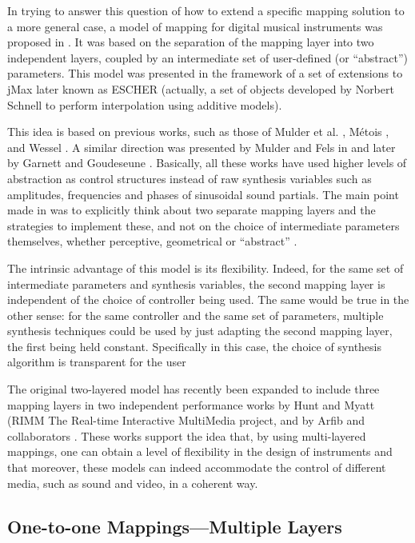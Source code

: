 In trying to answer this question of how to extend a specific mapping solution
to a more general case, a model of mapping for digital musical instruments was
proposed in \cite{Wanderley:1998}.  It was based on the separation of the mapping layer into two
independent layers, coupled by an intermediate set of user-defined (or
``abstract'') parameters. This model was presented in the framework of a set of
extensions to jMax later known as ESCHER (actually, a set of objects developed by
Norbert Schnell to perform interpolation using additive models).

This idea is based on previous works, such as those of Mulder et al. \cite{Mulder:1997},
M\'{e}tois \cite{Metois:1996}, and Wessel \cite{Wessel:1979}. A similar direction was presented by Mulder and
Fels in \cite{Mulder:1998a} and later by Garnett and Goudeseune \cite{Garnett:1999}. Basically, all these works
have used higher levels of abstraction as control structures instead of raw
synthesis variables such as amplitudes, frequencies and phases of sinusoidal
sound partials. The main point made in \cite{Wanderley:1998} was to explicitly think about two
separate mapping layers and the strategies to implement these, and not on the
choice of intermediate parameters themselves, whether perceptive, geometrical or
``abstract'' \cite{Wanderley:1999}.

The intrinsic advantage of this model is its flexibility. Indeed, for the same
set of intermediate parameters and synthesis variables, the second
mapping layer is independent of the choice of controller being used. The same
would be true in the other sense: for the same controller and the same set of
parameters, multiple synthesis techniques could be used by just adapting
the second mapping layer, the first being held constant. Specifically in this
case, the choice of synthesis algorithm is transparent for the user

The original two-layered model has recently been expanded to include three
mapping layers in two independent performance works by Hunt and Myatt (RIMM The Real-time Interactive MultiMedia project, and
by Arfib and collaborators \cite{Arfib:2002}.  These works support the idea that, by using
multi-layered mappings, one can obtain a level of flexibility in the design of
instruments and that moreover, these models can indeed accommodate the control of
different media, such as sound and video, in a coherent way.

\subsection{One-to-one Mappings---Multiple Layers}

